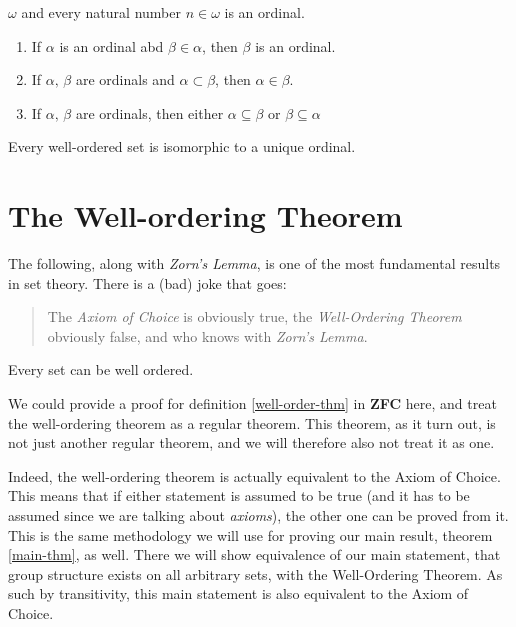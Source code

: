 \documentclass[../../main.tex]{subfiles}
\begin{document}
\begin{lemma}
    $\omega$ and every natural number $n \in \omega$ is an ordinal.
\end{lemma}

\begin{lemma}\cite[Lemma 2.3, p.15]{Jec78}
    \begin{enumerate}
        \item If $\alpha$ is an ordinal abd $\beta \in \alpha$, then $\beta$ is an ordinal.
        \item If $\alpha,\, \beta$ are ordinals and $\alpha \subset \beta$, then $\alpha \in \beta$.
        \item If $\alpha,\, \beta$ are ordinals, then either  $\alpha \subseteq \beta$ or $\beta \subseteq \alpha$
    \end{enumerate}
\end{lemma}

\begin{theorem}\cite[Theorem 2, p.15]{Jec78}
    Every well-ordered set is isomorphic to a unique ordinal.
\end{theorem}

\section{The Well-ordering Theorem}
The following, along with \textit{Zorn's Lemma}, is one of the most fundamental results in set theory.
There is a (bad) joke that goes:
\begin{quote} %
    The \textit{Axiom of Choice} is obviously true, the \textit{Well-Ordering Theorem} obviously false, 
    and who knows with \textit{Zorn's Lemma}.
\end{quote}

\begin{definition}\cite[Theorem 15, p.39]{Jec78}\label{well-order-thm}
    \newline Every set can be well ordered.
\end{definition}

We could provide a proof for definition \ref{well-order-thm} in \textbf{ZFC} here, 
and treat the well-ordering theorem as a regular theorem.
This theorem, as it turn out, is not just another regular theorem, and we will therefore also not treat it as one.

Indeed, the well-ordering theorem is actually equivalent to the Axiom of Choice.
This means that if either statement is assumed to be true (and it has to be assumed since we are talking about \textit{axioms}),
the other one can be proved from it.
This is the same methodology we will use for proving our main result, theorem \ref{main-thm}, as well.
There we will show equivalence of our main statement, that group structure exists on all arbitrary sets, with the Well-Ordering Theorem.
As such by transitivity, this main statement is also equivalent to the Axiom of Choice.
\end{document}
